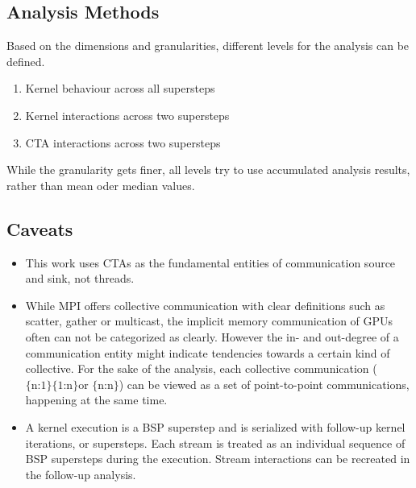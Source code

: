 \subsection{Analysis Methods}
Based on the dimensions and granularities, different levels for the analysis can be defined.
\begin{enumerate}[I]
	\item Kernel behaviour across all supersteps
	\item Kernel interactions across two supersteps
	\item CTA interactions across two supersteps
\end{enumerate}
While the granularity gets finer, all levels try to use accumulated analysis results, rather than mean oder median values.


\subsection{Caveats}\label{collectives}
\begin{itemize}
	\item This work uses CTAs as the fundamental entities of communication source and sink, not threads.
	\item While MPI offers collective communication with clear definitions such as scatter, gather or multicast, the implicit memory communication of GPUs often can not be categorized as clearly. However the in- and out-degree of a communication entity might indicate tendencies towards a certain kind of collective.
	For the sake of the analysis, each collective communication ($\textrm{\{n:1\} \{1:n\} or \{n:n\}} $) can be viewed as a set of point-to-point communications, happening at the same time.
	\item  A kernel execution is a BSP superstep and is serialized with follow-up kernel iterations, or supersteps. Each stream is treated as
	an individual sequence of BSP supersteps during the execution. Stream interactions can be recreated in the follow-up analysis.
\end{itemize}